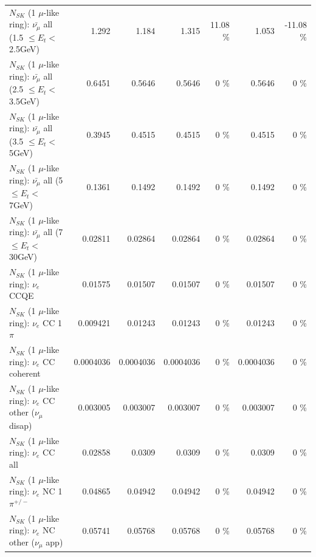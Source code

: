 \begin{table}
\begin{tabular}{| l | r | r | r  r | r  r |}
 $N_{SK}$ (1 $\mu$-like ring): $\bar{\nu_{\mu}}$ all (1.5 $\leq E_{t} <$ 2.5GeV) &           1.292 &           1.184 &           1.315 &    11.08 \%  &           1.053 &   -11.08 \%  \\ 
 $N_{SK}$ (1 $\mu$-like ring): $\bar{\nu_{\mu}}$ all (2.5 $\leq E_{t} <$ 3.5GeV) &          0.6451 &          0.5646 &          0.5646 &        0 \%  &          0.5646 &        0 \%  \\ 
   $N_{SK}$ (1 $\mu$-like ring): $\bar{\nu_{\mu}}$ all (3.5 $\leq E_{t} <$ 5GeV) &          0.3945 &          0.4515 &          0.4515 &        0 \%  &          0.4515 &        0 \%  \\ 
     $N_{SK}$ (1 $\mu$-like ring): $\bar{\nu_{\mu}}$ all (5 $\leq E_{t} <$ 7GeV) &          0.1361 &          0.1492 &          0.1492 &        0 \%  &          0.1492 &        0 \%  \\ 
    $N_{SK}$ (1 $\mu$-like ring): $\bar{\nu_{\mu}}$ all (7 $\leq E_{t} <$ 30GeV) &         0.02811 &         0.02864 &         0.02864 &        0 \%  &         0.02864 &        0 \%  \\ 
\hline
\hline
\hline
                                      $N_{SK}$ (1 $\mu$-like ring): $\nu_e$ CCQE &         0.01575 &         0.01507 &         0.01507 &        0 \%  &         0.01507 &        0 \%  \\ 
                                 $N_{SK}$ (1 $\mu$-like ring): $\nu_e$ CC 1$\pi$ &        0.009421 &         0.01243 &         0.01243 &        0 \%  &         0.01243 &        0 \%  \\ 
                               $N_{SK}$ (1 $\mu$-like ring): $\nu_e$ CC coherent &       0.0004036 &       0.0004036 &       0.0004036 &        0 \%  &       0.0004036 &        0 \%  \\ 
                $N_{SK}$ (1 $\mu$-like ring): $\nu_e$ CC other ($\nu_\mu$ disap) &        0.003005 &        0.003007 &        0.003007 &        0 \%  &        0.003007 &        0 \%  \\ 
                                  $N_{SK}$ (1 $\mu$-like ring): $\nu_{e}$ CC all &         0.02858 &          0.0309 &          0.0309 &        0 \%  &          0.0309 &        0 \%  \\ 
\hline
                           $N_{SK}$ (1 $\mu$-like ring): $\nu_e$ NC 1$\pi^{+/-}$ &         0.04865 &         0.04942 &         0.04942 &        0 \%  &         0.04942 &        0 \%  \\ 
                  $N_{SK}$ (1 $\mu$-like ring): $\nu_e$ NC other ($\nu_\mu$ app) &         0.05741 &         0.05768 &         0.05768 &        0 \%  &         0.05768 &        0 \%  \\ 

\end{tabular}
\end{table}
